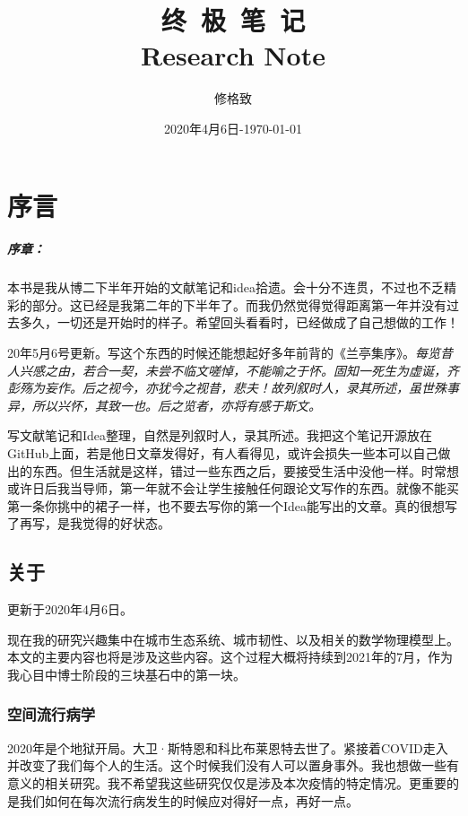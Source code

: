 \documentclass[letterpaper,10pt]{book}
\title{\Huge{\textbf{终\ 极\ 笔\ 记}} \\ \vspace{0.5cm} \huge{Research Note}}
\author{修格致}
\date{2020年4月6日-\today}
\begin{document}
\frontmatter

\maketitle

\tableofcontents

\mainmatter

\chapter{序言}

\paragraph{序章：} 本书是我从博二下半年开始的文献笔记和idea拾遗。会十分不连贯，不过也不乏精彩的部分。这已经是我第二年的下半年了。而我仍然觉得觉得距离第一年并没有过去多久，一切还是开始时的样子。希望回头看看时，已经做成了自己想做的工作！

20年5月6号更新。写这个东西的时候还能想起好多年前背的《兰亭集序》。\textit{每览昔人兴感之由，若合一契，未尝不临文嗟悼，不能喻之于怀。固知一死生为虚诞，齐彭殇为妄作。后之视今，亦犹今之视昔，悲夫！故列叙时人，录其所述，虽世殊事异，所以兴怀，其致一也。后之览者，亦将有感于斯文。}

写文献笔记和Idea整理，自然是列叙时人，录其所述。我把这个笔记开源放在GitHub上面，若是他日文章发得好，有人看得见，或许会损失一些本可以自己做出的东西。但生活就是这样，错过一些东西之后，要接受生活中没他一样。时常想或许日后我当导师，第一年就不会让学生接触任何跟论文写作的东西。就像不能买第一条你挑中的裙子一样，也不要去写你的第一个Idea能写出的文章。真的很想写了再写，是我觉得的好状态。


\section{关于}
\textcolor[rgb]{0,0,1}{更新于2020年4月6日。}

现在我的研究兴趣集中在城市生态系统、城市韧性、以及相关的数学物理模型上。本文的主要内容也将是涉及这些内容。这个过程大概将持续到2021年的7月，作为我心目中博士阶段的三块基石中的第一块。

\subsection{空间流行病学}
2020年是个地狱开局。大卫·斯特恩和科比布莱恩特去世了。紧接着COVID走入并改变了我们每个人的生活。这个时候我们没有人可以置身事外。我也想做一些有意义的相关研究。我不希望我这些研究仅仅是涉及本次疫情的特定情况。更重要的是我们如何在每次流行病发生的时候应对得好一点，再好一点。
\end{document}
